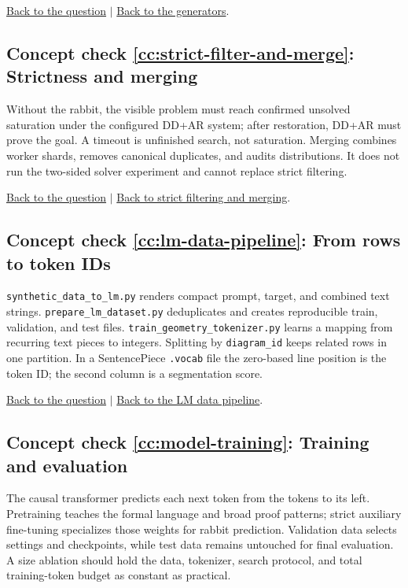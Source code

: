 \documentclass[reqno]{amsart}
\DeclareMathOperator{\1}{\textbf{1}}
\begin{document}
\noindent\hyperlink{ccq:generator-roles}{Back to the question}
$\mid$
\hyperref[sec: generate synthetic data.py]{Back to the generators}.

\hypertarget{cca:strict-filter-and-merge}{}
\subsection*{Concept check \ref{cc:strict-filter-and-merge}: Strictness and merging}

Without the rabbit, the visible problem must reach confirmed unsolved
saturation under the configured DD+AR system; after restoration, DD+AR must
prove the goal. A timeout is unfinished search, not saturation. Merging
combines worker shards, removes canonical duplicates, and audits
distributions. It does not run the two-sided solver experiment and cannot
replace strict filtering.

\noindent\hyperlink{ccq:strict-filter-and-merge}{Back to the question}
$\mid$
\hyperref[sec:strict-filtering]{Back to strict filtering and merging}.

\hypertarget{cca:lm-data-pipeline}{}
\subsection*{Concept check \ref{cc:lm-data-pipeline}: From rows to token IDs}

\verb|synthetic_data_to_lm.py| renders compact prompt, target, and combined
text strings. \verb|prepare_lm_dataset.py| deduplicates and creates
reproducible train, validation, and test files. \verb|train_geometry_tokenizer.py|
learns a mapping from recurring text pieces to integers. Splitting by
\verb|diagram_id| keeps related rows in one partition. In a SentencePiece
\verb|.vocab| file the zero-based line position is the token ID; the second
column is a segmentation score.

\noindent\hyperlink{ccq:lm-data-pipeline}{Back to the question}
$\mid$
\hyperref[sec:lm-data-pipeline]{Back to the LM data pipeline}.

\hypertarget{cca:model-training}{}
\subsection*{Concept check \ref{cc:model-training}: Training and evaluation}

The causal transformer predicts each next token from the tokens to its left.
Pretraining teaches the formal language and broad proof patterns; strict
auxiliary fine-tuning specializes those weights for rabbit prediction.
Validation data selects settings and checkpoints, while test data remains
untouched for final evaluation. A size ablation should hold the data,
tokenizer, search protocol, and total training-token budget as constant as
practical.
\end{document}
